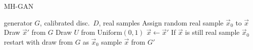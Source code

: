 \begin{algorithm}[tb]
   \caption{MH-GAN}
   \label{alg:mhgan}
\begin{algorithmic}
    generator $G$, calibrated disc.~$D$, real samples
   \STATE Assign random real sample $\vec x_0$ to $\vec x$
   \STATE Draw $\vec x'$ from $G$
   \STATE Draw $U$ from $\textrm{Uniform}(0,1)$
   \STATE $\vec x \leftarrow \vec x'$
   \ENDIF
   \ENDFOR
   \STATE If $\vec x$ is still real sample $\vec x_0$ restart with draw from $G$ as $\vec x_0$
    sample $\vec x$ from $G'$
\end{algorithmic}
\end{algorithm}
